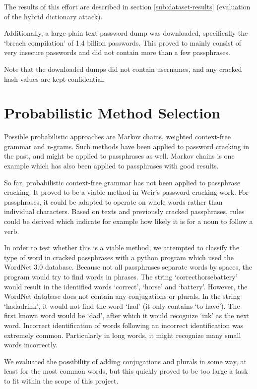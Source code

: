 \documentclass{article}
\begin{document}
The results of this effort are described in section \ref{sub:dataset-results}
(evaluation of the hybrid dictionary attack).

Additionally, a large plain text password dump was downloaded, specifically the
`breach compilation' of 1.4 billion passwords. This proved to mainly consist of
very insecure passwords and did not contain more than a few passphrases.

Note that the downloaded dumps did not contain usernames, and any cracked hash
values are kept confidential.


\section{Probabilistic Method Selection}\label{sec:methods-comparison}

Possible probabilistic approaches are Markov chains, weighted context-free
grammar and n-grams. Such methods have been applied to password cracking in
the past, and might be applied to passphrases as well. Markov chains is one
example which has also been applied to passphrases\cite{sparell-simovits} with
good results.

So far, probabilistic context-free grammar has not been applied to passphrase
cracking. It proved to be a viable method in Weir's\cite{weir} password
cracking work. For passphrases, it could be adapted to operate on whole words
rather than individual characters. Based on texts and previously cracked
passphrases, rules could be derived which indicate for example how likely it is
for a noun to follow a verb.

In order to test whether this is a viable method, we attempted to classify the
type of word in cracked passphrases with a python program which used the
WordNet 3.0 database\cite{wordnet}. Because not all passphrases separate words
by spaces, the program would try to find words in phrases. The string
`correcthorsebattery' would result in the identified words `correct', `horse'
and `battery'. However, the WordNet database does not contain any conjugations
or plurals. In the string `hadadrink', it would not find the word `had' (it
only contains `to have'). The first known word would be `dad', after which it
would recognize `ink' as the next word. Incorrect identification of words
following an incorrect identification was extremely common. Particularly in
long words, it might recognize many small words incorrectly.

We evaluated the possibility of adding conjugations and plurals in some way, at
least for the most common words, but this quickly proved to be too large a task
to fit within the scope of this project.
\end{document}
